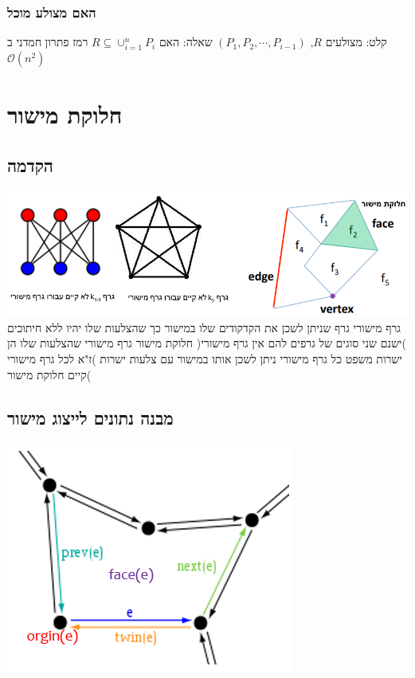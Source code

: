 \documentclass{article}
\makeatletter
\newcommand*{\saved@uline}{}
\let\saved@uline\uline
\newcommand*{\mathuline}{%
  \mathpalette{\math@uline\saved@uline}%
}
\newcommand*{\math@uline}[3]{%
  \mbox{#1{$#2#3\m@th$}}%
}
\renewcommand*{\uline}{%
  \relax  
  \ifmmode
    \expandafter\mathuline
  \else
    \expandafter\saved@uline
  \fi
}
\makeatother
\begin{document}
\subsubsection{האם מצולע מוכל}
\noindent \uline{קלט:} מצולעים $R$, $(P_1, P_2, \cdots, P_{i-1})$
\newline \uline{ שאלה:} האם $R \subseteq \cup_{i=1}^n P_i$
\newline\uline{רמז} פתרון חמדני ב$\mathcal{O}(n^2)$

\section{חלוקת מישור}
\subsection{הקדמה}
\includegraphics[scale=0.65]{z14.png} 
\newline\noindent\uline{גרף מישורי} גרף שניתן לשכן את הקדקודים שלו במישור כך שהצלעות שלו יהיו ללא חיתוכים )ישנם שני סוגים של גרפים להם אין גרף מישורי(
\newline\uline{חלוקת מישור} גרף מישורי שהצלעות שלו הן ישרות
\newline\uline{משפט} כל גרף מישורי ניתן לשכן אותו במישור עם צלעות ישרות )ז"א לכל גרף מישורי קיים חלוקת מישור(
\subsection{מבנה נתונים לייצוג מישור}

\includegraphics[scale=0.6]{z15.png} 
\end{document}
